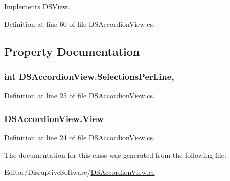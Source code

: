 Implements \hyperlink{class_d_s_view_a29230a74867dbbd01d5f79506f354fd9}{D\+S\+View}.



Definition at line 60 of file D\+S\+Accordion\+View.\+cs.



\subsection{Property Documentation}
\hypertarget{class_d_s_accordion_view_aaeb24bc767253f90adc3bb74e5657c29}{
\subsubsection[{Selections\+Per\+Line}]{\setlength{\rightskip}{0pt plus 5cm}int D\+S\+Accordion\+View.\+Selections\+Per\+Line\hspace{0.3cm}{\ttfamily [get]}, {\ttfamily [set]}}}\label{class_d_s_accordion_view_aaeb24bc767253f90adc3bb74e5657c29}


Definition at line 25 of file D\+S\+Accordion\+View.\+cs.

\hypertarget{class_d_s_accordion_view_aeed639c86992b1a14a3105a0ab3c69d3}{
\subsubsection[{View}]{ D\+S\+Accordion\+View.\+View\hspace{0.3cm}{\ttfamily [get]}}}\label{class_d_s_accordion_view_aeed639c86992b1a14a3105a0ab3c69d3}


Definition at line 24 of file D\+S\+Accordion\+View.\+cs.



The documentation for this class was generated from the following file\+:\begin{DoxyCompactItemize}
\item 
Editor/\+Disruptive\+Software/\hyperlink{_d_s_accordion_view_8cs}{D\+S\+Accordion\+View.\+cs}\end{DoxyCompactItemize}
